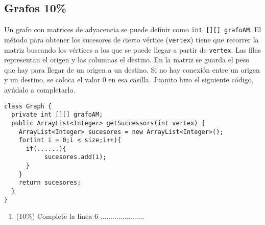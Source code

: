 \documentclass[10 pt]{article}
\begin{document}
\begin{multicols}{2}
\section{Grafos 10\%}
Un grafo con matrices de adyacencia se puede definir como \texttt{int [][] grafoAM}.
El método para obtener los sucesores de cierto vértice (\texttt{vertex}) tiene que
recorrer la matriz buscando los vértices a los que se puede llegar a partir de \texttt{vertex}.
Las filas representan el origen y las columnas el destino. En la matriz se guarda el peso que hay para llegar de un origen a un
destino. Si no hay conexión entre un origen y un destino, se coloca el valor $0$ en esa casilla.
Juanito hizo el siguiente código, ayúdalo a completarlo.

\begin{lstlisting}
class Graph {
  private int [][] grafoAM;
  public ArrayList<Integer> getSuccessors(int vertex) {
    ArrayList<Integer> sucesores = new ArrayList<Integer>();
    for(int i = 0;i < size;i++){           
      if(......){
           sucesores.add(i);
      }
    }
    return sucesores;
  }
}
\end{lstlisting}
\begin{enumerate}[label=\alph*]
\item (10\%) Complete la línea 6 ......................
\end{enumerate}


\end{multicols}
\end{document}
